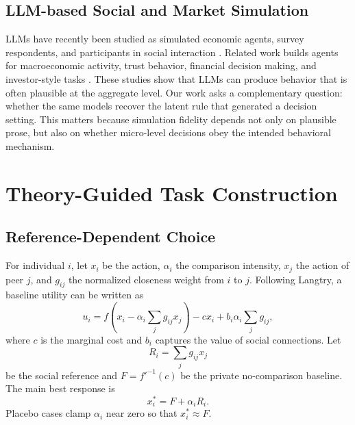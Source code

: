 \documentclass[11pt]{article}
\begin{document}
\subsection{LLM-based Social and Market Simulation}
LLMs have recently been studied as simulated economic agents, survey respondents, and participants in social interaction \cite{horton2023large, zhou2024real, manning2026general}.
Related work builds agents for macroeconomic activity, trust behavior, financial decision making, and investor-style tasks \cite{jia2024can, li2024econagent, li2025investorbench}.
These studies show that LLMs can produce behavior that is often plausible at the aggregate level.
Our work asks a complementary question: whether the same models recover the latent rule that generated a decision setting.
This matters because simulation fidelity depends not only on plausible prose, but also on whether micro-level decisions obey the intended behavioral mechanism.

\section{Theory-Guided Task Construction}
\label{sec:tasks}

\subsection{Reference-Dependent Choice}
For individual $i$, let $x_i$ be the action, $\alpha_i$ the comparison intensity, $x_j$ the action of peer $j$, and $g_{ij}$ the normalized closeness weight from $i$ to $j$.
Following Langtry, a baseline utility can be written as
\begin{equation}
u_i =
f\!\left(x_i-\alpha_i\sum_j g_{ij}x_j\right)
-cx_i+b_i\alpha_i\sum_j g_{ij},
\label{eq:utility}
\end{equation}
where $c$ is the marginal cost and $b_i$ captures the value of social connections.
Let
\begin{equation}
R_i=\sum_j g_{ij}x_j
\end{equation}
be the social reference and $F=f'^{-1}(c)$ be the private no-comparison baseline.
The main best response is
\begin{equation}
x_i^*=F+\alpha_iR_i.
\label{eq:main_rule}
\end{equation}
Placebo cases clamp $\alpha_i$ near zero so that $x_i^*\approx F$.
\end{document}
